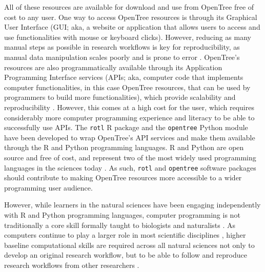 \documentclass[12pt]{article}
\begin{document}
All of these resources
are available for download and use from OpenTree free of cost to any user.
One way to access OpenTree resources is through its Graphical User Interface (GUI; aka, a website or application that allows users to access and use functionalities with mouse or keyboard clicks).
However, reducing as many manual steps as possible in research workflows is key for reproducibility, as manual data manipulation scales poorly and is prone to error \citep{bakken2019journey}.
OpenTree's resources are also programmatically available through its Application Programming Interface services (APIs; aka, computer code that implements computer functionalities, in this case OpenTree resources, that can be used by programmers
to build more functionalities), which provide scalability and reproducibility \citep{opentreeAPIv3}.
However, this comes at a high cost for the user, which requires considerably more computer programming experience and literacy to be able to successfully use APIs.
The \texttt{rotl} R package \citep{michonneau2016rotl} and the \texttt{opentree} Python module \citep{mctavish2021opentree} have been developed to wrap OpenTree's API services
and make them available through the R and Python programming languages.
R and Python are open source and free of cost, and represent two of the most widely used programming languages in the sciences today \citep{eglen2009quick, baker2017scientific}.
As such, \texttt{rotl} and \texttt{opentree} software packages should contribute to making OpenTree resources more accessible to a wider programming user audience.

However, while learners in the natural sciences have been engaging independently with R and Python programming languages, computer programming is not traditionally a core skill formally taught to biologists and naturalists \citep{sayres2018bioinformatics, wright2019the, williams2019barriers}.
As computers continue to play a larger role in most scientific disciplines \citep{piccolo2016tools}, higher baseline computational skills are required across all natural sciences not only to develop an original research workflow, but to be able to follow and reproduce research workflows from other researchers \citep{nasem2019reproducibility}.
\end{document}

